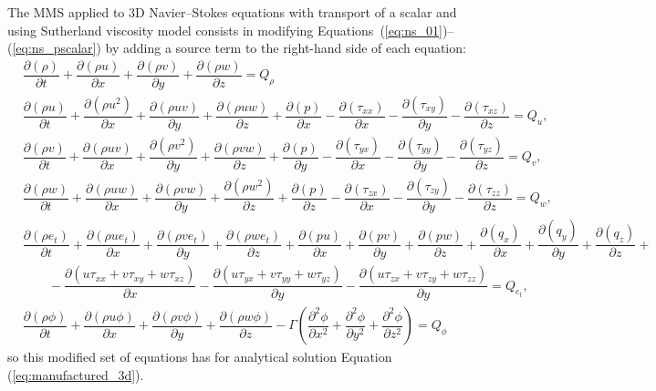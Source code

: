 \documentclass[10pt]{article}
\newcommand{\Diff}[2] {\dfrac{\partial( #1)}{\partial #2}}
\newcommand{\diff}[2] {\dfrac{\partial #1}{\partial #2}}
\begin{document}
The MMS applied to 3D Navier--Stokes equations with transport of a scalar and using Sutherland viscosity model consists in modifying Equations~(\ref{eq:ns_01})--(\ref{eq:ns_pscalar}) by adding a source term to the right-hand side of each equation:
\begin{equation}
\begin{split}
\label{eq:ns_3d_mod}
&\Diff{\rho}{t} +\Diff{\rho u}{x}+\Diff{\rho v}{y} + \Diff{\rho w}{z} = Q_\rho\\
%
 &\Diff{\rho u}{t} +\Diff{\rho u^2 }{x}+\Diff{\rho uv}{y} +\Diff{\rho uw}{z} +\Diff{p}{x}-\Diff{\tau_{xx}}{x}-\Diff{\tau_{xy}}{y}-\Diff{\tau_{xz}}{z}= Q_u,\\
%
&\Diff{\rho v}{t} +\Diff{\rho uv }{x}+\Diff{\rho v^2}{y} +\Diff{\rho vw}{z}+\Diff{p}{y}-\Diff{\tau_{yx}}{x}-\Diff{\tau_{yy}}{y}-\Diff{\tau_{yz}}{z}= Q_v,\\
%
&\Diff{\rho w}{t} +\Diff{\rho  uw }{ x}+\Diff{\rho  vw }{ y}+\Diff{\rho w^2 }{ z}+\Diff{p}{z}-\Diff{\tau_{zx}}{x}-\Diff{\tau_{zy}}{y}-\Diff{\tau_{zz}}{z}=Q_w,\\
%
&\Diff{\rho e_t}{t} +\Diff{\rho u e_t}{x}+\Diff{\rho v e_t}{y}+\Diff{\rho we_t}{z}+\Diff{pu}{x}+\Diff{pv}{y}+\Diff{pw}{z} +\Diff{q_x}{x} +\Diff{q_y}{y} +\Diff{q_z}{z}+\\
    &\qquad-\Diff{u\tau_{xx}+v\tau_{xy}+w\tau_{xz}}{x}-\Diff{u\tau_{yx}+v\tau_{yy}+w\tau_{yz}}{y}-\Diff{u\tau_{zx}+v\tau_{zy}+w\tau_{zz}}{y}=Q_{e_t},\\
&\Diff{\rho\phi}{t} + \Diff{\rho u \phi}{x} + \Diff{\rho v \phi}{y} + \Diff{\rho w \phi}{z} - \Gamma \left( \diff{^2 \phi}{x^2} +\diff{^2 \phi}{y^2} + \diff{^2 \phi}{z^2} \right) = Q_{\phi}
\end{split}
\end{equation}
so this modified set of equations has for analytical solution Equation (\ref{eq:manufactured_3d}).
\end{document}
